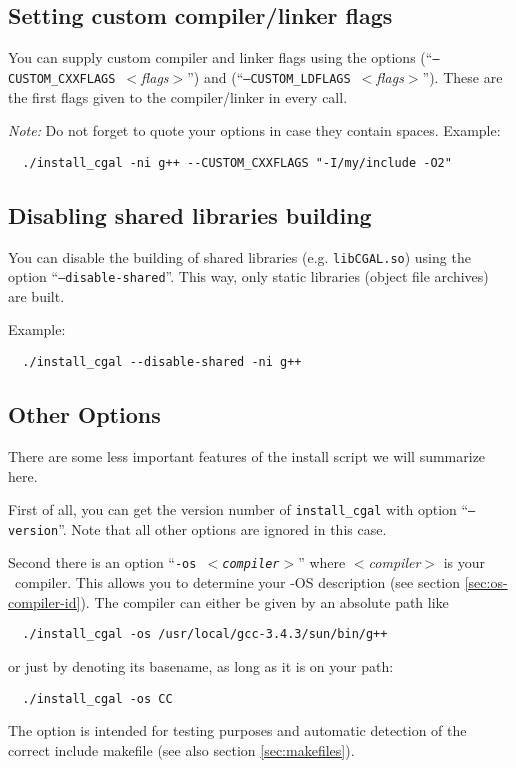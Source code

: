 \subsection{Setting custom compiler/linker flags}\label{sec:custom-setup}

You can supply custom compiler and linker flags using the options
\mbox{(``\texttt{--CUSTOM\_CXXFLAGS}
  \textit{$<$flags$>$}'')} and
\mbox{(``\texttt{--CUSTOM\_LDFLAGS}
  \textit{$<$flags$>$}'')}.  These are the
first flags given to the compiler/linker in every call.

\textit{Note:} Do not forget to quote your options in case they
contain spaces. Example:
\begin{verbatim}
  ./install_cgal -ni g++ --CUSTOM_CXXFLAGS "-I/my/include -O2"
\end{verbatim}


\subsection{Disabling shared libraries building}\label{sec:disable-shared-setup}

You can disable the building of shared libraries (e.g. \texttt{libCGAL.so})
using the option \mbox{``\texttt{--disable-shared}''}.
This way, only static libraries (object file archives) are built.

Example:
\begin{verbatim}
  ./install_cgal --disable-shared -ni g++
\end{verbatim}


\subsection{Other Options}\label{sec:other-options}

There are some less important features of the install script we will
summarize here.

First of all, you can get the version number of \texttt{install\_cgal}
with option ``\texttt{--version}''. Note that all other options are
ignored in this case.

Second there is an option ``\texttt{-os \textit{$<$compiler$>$}}''
where \textit{$<$compiler$>$} is your \CC\ compiler. This allows you
to determine your \cgal-OS description (see section
\ref{sec:os-compiler-id}). The compiler can either be given by an
absolute path like
\begin{verbatim}
  ./install_cgal -os /usr/local/gcc-3.4.3/sun/bin/g++
\end{verbatim}
or just by denoting its basename, as long as it is on your path:
\begin{verbatim}
  ./install_cgal -os CC
\end{verbatim}
The option is intended for testing purposes and automatic detection of
the correct include makefile (see also section \ref{sec:makefiles}).

